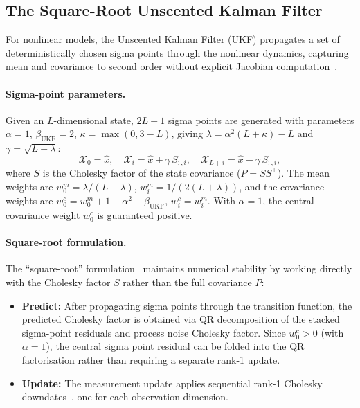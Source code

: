 \documentclass[11pt,a4paper]{article}
\theoremstyle{definition}
\begin{document}
	\subsection{The Square-Root Unscented Kalman Filter}
	\label{sec:ukf}
	
	For nonlinear models, the Unscented Kalman Filter (UKF) propagates a set of deterministically chosen sigma points through the nonlinear dynamics, capturing mean and covariance to second order without explicit Jacobian computation~\cite{vandermerwe2001}.
	
	\paragraph{Sigma-point parameters.}
	Given an $L$-dimensional state, $2L+1$ sigma points are generated with parameters $\alpha = 1$, $\beta_{\mathrm{UKF}} = 2$, $\kappa = \max(0, 3 - L)$, giving $\lambda = \alpha^2(L + \kappa) - L$ and $\gamma = \sqrt{L + \lambda}$:
	\begin{equation}\label{eq:sigma_pts}
		\mathcal{X}_0 = \hat{x}, \quad \mathcal{X}_i = \hat{x} + \gamma \, S_{:,i}, \quad \mathcal{X}_{L+i} = \hat{x} - \gamma \, S_{:,i},
	\end{equation}
	where $S$ is the Cholesky factor of the state covariance ($P = SS^\top$).
	The mean weights are $w^m_0 = \lambda/(L+\lambda)$, $w^m_i = 1/(2(L+\lambda))$, and the covariance weights are $w^c_0 = w^m_0 + 1 - \alpha^2 + \beta_{\mathrm{UKF}}$, $w^c_i = w^m_i$.
	With $\alpha = 1$, the central covariance weight $w^c_0$ is guaranteed positive.
	
	\paragraph{Square-root formulation.}
	The ``square-root'' formulation~\cite{vandermerwe2001} maintains numerical stability by working directly with the Cholesky factor $S$ rather than the full covariance $P$:
	\begin{itemize}
		\item \textbf{Predict:} After propagating sigma points through the transition function, the predicted Cholesky factor is obtained via QR decomposition of the stacked sigma-point residuals and process noise Cholesky factor.
		Since $w^c_0 > 0$ (with $\alpha = 1$), the central sigma point residual can be folded into the QR factorisation rather than requiring a separate rank-1 update.
		\item \textbf{Update:} The measurement update applies sequential rank-1 Cholesky downdates~\cite{gill1974methods}, one for each observation dimension.
	\end{itemize}
	
\end{document}
